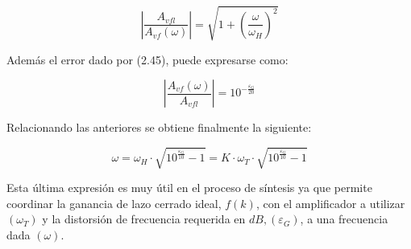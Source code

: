 \begin{equation}
\left| \frac{A_{vfl}}{A_{vf}(\omega)} \right| = \sqrt{1 + \left( \frac{\omega}{\omega_H} \right)^2} \tag{2.48}
\end{equation}

\noindent Además el error dado por (2.45), puede expresarse como:

\begin{equation}
\left| \frac{A_{vf}(\omega)}{A_{vfl}} \right| = 10^{-\frac{\varepsilon_G}{20}} \tag{2.49}
\end{equation}

\noindent Relacionando las anteriores se obtiene finalmente la siguiente:

\begin{equation}
\omega = \omega_H \cdot \sqrt{10^{\frac{\varepsilon_G}{10}} - 1} = K \cdot \omega_T \cdot \sqrt{10^{\frac{\varepsilon_G}{10}} - 1} \tag{2.50}
\end{equation}

\noindent Esta última expresión es muy útil en el proceso de síntesis ya que permite coordinar la ganancia de lazo cerrado ideal, $f(k)$, con el amplificador a utilizar $(\omega_T)$ y la distorsión de frecuencia requerida en $dB, (\varepsilon_G)$, a una frecuencia dada $(\omega)$.
